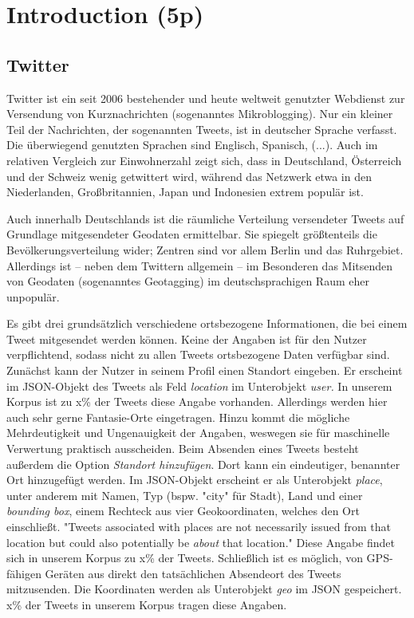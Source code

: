 \documentclass[../Main.tex]{subfiles}
\begin{document}
\section{Introduction (5p)}
\subsection{Twitter} %
Twitter ist ein seit 2006 bestehender und heute weltweit genutzter Webdienst zur Versendung von Kurznachrichten (sogenanntes Mikroblogging). Nur ein kleiner Teil der Nachrichten, der sogenannten Tweets, ist in deutscher Sprache verfasst. Die überwiegend genutzten Sprachen sind Englisch, Spanisch, (...). Auch im relativen Vergleich zur Einwohnerzahl zeigt sich, dass in Deutschland, Österreich und der Schweiz wenig getwittert wird, während das Netzwerk etwa in den Niederlanden, Großbritannien, Japan und Indonesien extrem populär ist.

Auch innerhalb Deutschlands ist die räumliche Verteilung versendeter Tweets auf Grundlage mitgesendeter Geodaten ermittelbar. Sie spiegelt größtenteils die Bevölkerungsverteilung wider; Zentren sind vor allem Berlin und das Ruhrgebiet. Allerdings ist -- neben dem Twittern allgemein -- im Besonderen das Mitsenden von Geodaten (sogenanntes Geotagging) im deutschsprachigen Raum eher unpopulär.

Es gibt drei grundsätzlich verschiedene ortsbezogene Informationen, die bei einem Tweet mitgesendet werden können. Keine der Angaben ist für den Nutzer verpflichtend, sodass nicht zu allen Tweets ortsbezogene Daten verfügbar sind.
Zunächst kann der Nutzer in seinem Profil einen Standort eingeben. Er erscheint im JSON-Objekt des Tweets als Feld \textit{location} im Unterobjekt \textit{user.} In unserem Korpus ist zu x\% der Tweets diese Angabe vorhanden. Allerdings werden hier auch sehr gerne Fantasie-Orte eingetragen. Hinzu kommt die mögliche Mehrdeutigkeit und Ungenauigkeit der Angaben, weswegen sie für maschinelle Verwertung praktisch ausscheiden.
Beim Absenden eines Tweets besteht außerdem die Option \textit{Standort hinzufügen}. Dort kann ein eindeutiger, benannter Ort hinzugefügt werden. Im JSON-Objekt erscheint er als Unterobjekt \textit{place}, unter anderem mit Namen, Typ (bspw. "city" für Stadt), Land und einer \textit{bounding box}, einem Rechteck aus vier Geokoordinaten, welches den Ort einschließt.
"Tweets associated with places are not necessarily issued from that location but could also potentially be \textit{about} that location."
Diese Angabe findet sich in unserem Korpus zu x\% der Tweets.
Schließlich ist es möglich, von GPS-fähigen Geräten aus direkt den tatsächlichen Absendeort des Tweets mitzusenden. Die Koordinaten werden als Unterobjekt \textit{geo} im JSON gespeichert. x\% der Tweets in unserem Korpus tragen diese Angaben.
\end{document}
